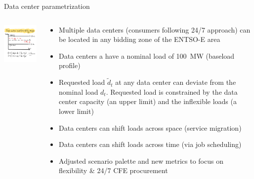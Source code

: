 \begin{frame}{Data center parametrization}

  \begin{columns}[T]
  \begin{column}{5cm}

  \centering
  \vspace{0.3cm}
  \includegraphics[width=5cm]{images/load_flex.png}

  \vspace{0.1cm}
  {\scriptsize
   
  }
  \end{column}

  \begin{column}{10cm}
  {\small
  \begin{itemize}

  \item \alert{Multiple data centers} (consumers following 24/7 approach) can be located 
        in any bidding zone of the ENTSO-E area

  \item Data centers a have a nominal load of \alert{100~MW} (baseload profile)

  \item Requested load $\widetilde{d}_t$ at any data center can deviate from the nominal load $d_t$. 
        Requested load is constrained by the \alert{data center capacity} 
        (an upper limit) and the \alert{inflexible loads} (a lower limit)
  
  \item Data centers can \alert{shift loads across space} (service migration)
  
  \item Data centers can \alert{shift loads across time} (via job scheduling)

  \item Adjusted scenario palette and new metrics to focus on flexibility \& 24/7 CFE procurement
  
  \end{itemize}
  }

  \end{column}
  \end{columns}

\end{frame}


